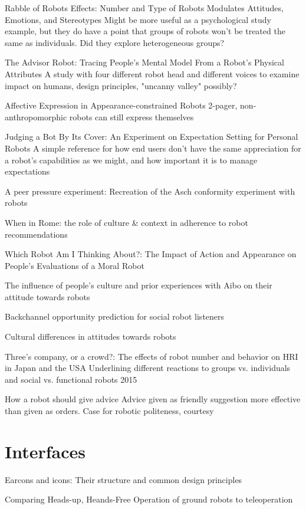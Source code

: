 \documentclass{sfuthesis}
\begin{document}
Rabble of Robots Effects: Number and Type of Robots Modulates Attitudes, Emotions, and Stereotypes	Might be more useful as a psychological study example, but they do have a point that groups of robots won't be treated the same as individuals. Did they explore heterogeneous groups?	

The Advisor Robot: Tracing People's Mental Model From a Robot's Physical Attributes	A study with four different robot head and different voices to examine impact on humans, design principles, "uncanny valley" possibly?	

Affective Expression in Appearance-constrained Robots	2-pager, non-anthropomorphic robots can still express themselves

Judging a Bot By Its Cover: An Experiment on Expectation Setting for Personal Robots	A simple reference for how end users don't have the same appreciation for a robot's capabilities as we might, and how important it is to manage expectations	

A peer pressure experiment: Recreation of the Asch conformity experiment with robots

When in Rome: the role of culture & context in adherence to robot recommendations

Which Robot Am I Thinking About?: The Impact of Action and Appearance on People's Evaluations of a Moral Robot	

The influence of people’s culture and prior experiences with Aibo on their attitude towards robots

Backchannel opportunity prediction for social robot listeners

Cultural differences in attitudes towards robots

Three's company, or a crowd?: The effects of robot number and behavior on HRI in Japan and the USA	Underlining different reactions to groups vs. individuals and social vs. functional robots	2015

How a robot should give advice	Advice given as friendly suggestion more effective than given as orders. Case for robotic politeness, courtesy	

\section{Interfaces}

Earcons and icons: Their structure and common design principles

Comparing Heads-up, Heands-Free Operation of ground robots to teleoperation
\end{document}
